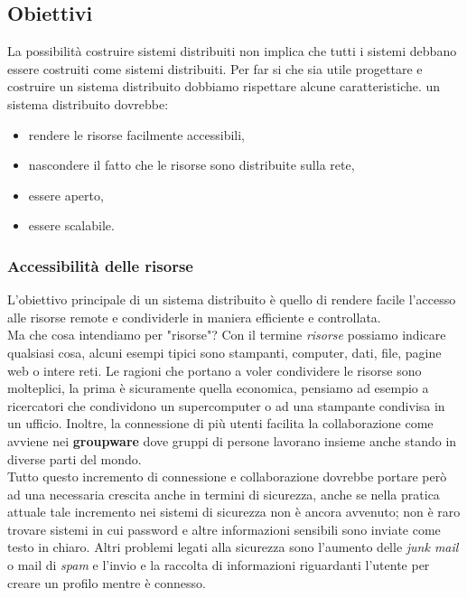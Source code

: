 \subsection{Obiettivi}
La possibilità costruire sistemi distribuiti non implica che tutti i sistemi debbano essere costruiti come sistemi distribuiti. Per far si che sia utile progettare e costruire un sistema distribuito dobbiamo rispettare alcune caratteristiche. un sistema distribuito dovrebbe:
\begin{itemize}
\item rendere le risorse facilmente accessibili,
\item nascondere il fatto che le risorse sono distribuite sulla rete,
\item essere aperto,
\item essere scalabile.
\end{itemize}
\subsubsection{Accessibilità delle risorse}
L'obiettivo principale di un sistema distribuito è quello di rendere facile l'accesso alle risorse remote e condividerle in maniera efficiente e controllata.\\
Ma che cosa intendiamo per "risorse"? Con il termine \emph{risorse} possiamo indicare qualsiasi cosa, alcuni esempi tipici sono stampanti, computer, dati, file, pagine web o intere reti.
Le ragioni che portano a voler condividere le risorse sono molteplici, la prima è sicuramente quella economica, pensiamo ad esempio a ricercatori che condividono un supercomputer o ad una stampante condivisa in un ufficio. Inoltre, la connessione di più utenti facilita la collaborazione come avviene nei \textbf{groupware} dove gruppi di persone lavorano insieme anche stando in diverse parti del mondo.\\
Tutto questo incremento di connessione e collaborazione dovrebbe portare però ad una necessaria crescita anche in termini di sicurezza, anche se nella pratica attuale tale incremento nei sistemi di sicurezza non è ancora avvenuto; non è raro trovare sistemi in cui password e altre informazioni sensibili sono inviate come testo in chiaro. Altri problemi legati alla sicurezza sono l'aumento delle \emph{junk mail} o mail di \emph{spam} e l'invio e la raccolta di informazioni riguardanti l'utente per creare un profilo mentre è connesso.
